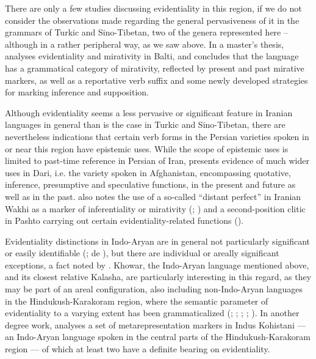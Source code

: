 \documentclass[output=paper]{langsci/langscibook}
\begin{document}
There are only a few studies discussing evidentiality in this region, if we do not consider the observations made regarding the general pervasiveness of it in the grammars of Turkic and Sino-Tibetan, two of the genera represented here – although in a rather peripheral way, as we saw above. In a master’s thesis, \cite{Jones2009} analyses evidentiality and mirativity in Balti, and concludes that the language has a grammatical category of mirativity, reflected by present and past mirative markers, as well as a reportative verb suffix and some newly developed strategies for marking inference and supposition. 

Although evidentiality seems a less pervasive or significant feature in Iranian languages in general than is the case in Turkic and Sino-Tibetan, there are nevertheless indications that certain verb forms in the Persian varieties spoken in or near this region have epistemic uses. While the scope of epistemic uses is limited to past-time reference in Persian of Iran, \cite{Perry2000} presents evidence of much wider uses in Dari, i.e. the variety spoken in Afghanistan, encompassing quotative, inference, presumptive and speculative functions, in the present and future as well as in the past. \citeauthor{Bashir2006} also notes the use of a so-called “distant perfect” in Iranian Wakhi as a marker of inferentiality or mirativity (\citeyear{Bashir2006}; \citeyear[840]{Bashir2009}) and a second-position clitic in Pashto carrying out certain evidentiality-related functions (\citeyear{Bashir2006}).

Evidentiality distinctions in Indo-Aryan are in general not particularly significant or easily identifiable (\citealt[279--291]{Masica1991}; de \citealt{Haan2013}), but there are individual or areally significant exceptions, a fact noted by \cite{Bashir2006}. Khowar, the Indo-Aryan language mentioned above, and its closest relative Kalasha, are particularly interesting in this regard, as they may be part of an areal configuration, also including non-Indo-Aryan languages in the Hindukush-Karakoram region, where the semantic parameter of evidentiality to a varying extent has been grammaticalized (\citealt{Bashir1988}; \citeyear{Bashir1996a}; \citeyear{Bashir1996b}; \citeyear[823]{Bashir2003}; \citeyear{Bashir2010}). In another degree work, \cite{Lubberger2014} analyses a set of metarepresentation markers in Indus Kohistani — an Indo-Aryan language spoken in the central parts of the Hindukush-Karakoram region — of which at least two have a definite bearing on evidentiality. 
\end{document}
